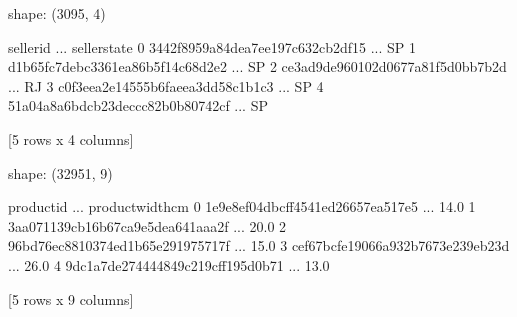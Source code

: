 \documentclass[letterpaper,10pt,english]{jupyterBook}
\begin{document}
\begin{sphinxVerbatim}[commandchars=\\\{\}]
  
  
\end{sphinxVerbatim}

\begin{sphinxVerbatim}[commandchars=\\\{\}]
shape: (3095, 4)
\end{sphinxVerbatim}

\begin{sphinxVerbatim}[commandchars=\\\{\}]
                          seller\PYGZus{}id  ...  seller\PYGZus{}state
0  3442f8959a84dea7ee197c632cb2df15  ...            SP
1  d1b65fc7debc3361ea86b5f14c68d2e2  ...            SP
2  ce3ad9de960102d0677a81f5d0bb7b2d  ...            RJ
3  c0f3eea2e14555b6faeea3dd58c1b1c3  ...            SP
4  51a04a8a6bdcb23deccc82b0b80742cf  ...            SP

[5 rows x 4 columns]
\end{sphinxVerbatim}

\begin{sphinxVerbatim}[commandchars=\\\{\}]
  
  
\end{sphinxVerbatim}

\begin{sphinxVerbatim}[commandchars=\\\{\}]
shape: (32951, 9)
\end{sphinxVerbatim}

\begin{sphinxVerbatim}[commandchars=\\\{\}]
                         product\PYGZus{}id  ... product\PYGZus{}width\PYGZus{}cm
0  1e9e8ef04dbcff4541ed26657ea517e5  ...             14.0
1  3aa071139cb16b67ca9e5dea641aaa2f  ...             20.0
2  96bd76ec8810374ed1b65e291975717f  ...             15.0
3  cef67bcfe19066a932b7673e239eb23d  ...             26.0
4  9dc1a7de274444849c219cff195d0b71  ...             13.0

[5 rows x 9 columns]
\end{sphinxVerbatim}
\end{document}
